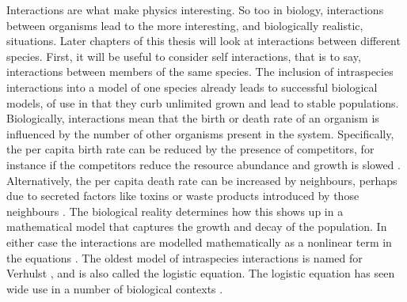Interactions are what make physics interesting. 
So too in biology, interactions between organisms lead to the more interesting, and biologically realistic, situations. 
Later chapters of this thesis will look at interactions between different species. 
First, it will be useful to consider self interactions, that is to say, interactions between members of the same species. 
The inclusion of intraspecies interactions into a model of one species already leads to successful biological models, of use in that they curb unlimited grown and lead to stable populations. 
Biologically, interactions mean that the birth or death rate of an organism is influenced by the number of other organisms present in the system. 
Specifically, the per capita birth rate can be reduced by the presence of competitors, for instance if the competitors reduce the resource abundance and growth is slowed \cite{Nadell2008,Vulic2001}. 
Alternatively, the per capita death rate can be increased by neighbours, perhaps due to secreted factors like toxins or waste products introduced by those neighbours \cite{Greenhalgh1990,VanMelderen2009,Rankin2012}. 
The biological reality determines how this shows up in a mathematical model that captures the growth and decay of the population. 
In either case the interactions are modelled mathematically as a nonlinear term in the equations \cite{Greenhalgh1990,Ovaskainen2010,Assaf2010,Allen2003,Norden1982,Newman2004,Allen2005,Fujita1953,Nasell2001}. 
%
The oldest model of intraspecies interactions is named for Verhulst \cite{Verhulst1838}, and is also called the logistic equation. 
The logistic equation has seen wide use in a number of biological contexts \cite{Ovaskainen2010,Wallace2002,Newman2004,Allen2005,Assaf2009,Greenhalgh1990,Hubbell2001,Adler2010,Kessler2007,Brock2006,Norden1982,Dushoff2000}. 

